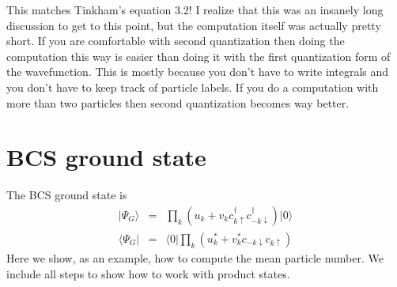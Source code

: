 \documentclass{article}
\begin{document}
This matches Tinkham's equation 3.2! I realize that this was an insanely
long discussion to get to this point, but the computation itself was
actually pretty short. If you are comfortable with second quantization
then doing the computation this way is easier than doing it with the
first quantization form of the wavefunction. This is mostly because
you don't have to write integrals and you don't have to keep track
of particle labels. If you do a computation with more than two particles
then second quantization becomes way better.


\section*{BCS ground state }

The BCS ground state is\begin{eqnarray*}
|\Psi_{G}\rangle & = & \prod_{k}(u_{k}+v_{k}c_{k\uparrow}^{\dagger}c_{-k\downarrow}^{\dagger})|0\rangle\\
\langle\Psi_{G}| & = & \langle0|\prod_{k}(u_{k}^{*}+v_{k}^{*}c_{-k\downarrow}c_{k\uparrow})\end{eqnarray*}
Here we show, as an example, how to compute the mean particle number.
We include all steps to show how to work with product states.
\end{document}
